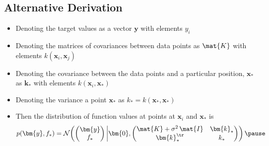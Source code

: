 \begin{slide}
\section[-2]{Alternative Derivation}

\begin{PauseHighLight}
  \begin{itemize}
  \item Denoting the target values as a vector $\bm{y}$ with elements
    $y_i$\pause
  \item Denoting the matrices of covariances between data points as
    $\mat{K}$ with elements $k(\bm{x}_i,\bm{x}_j)$\pause
  \item Denoting the covariance between the data points and a
    particular position, $\bm{x}_*$ as $\bm{k}_*$ with elements
    $k(\bm{x}_i, \bm{x}_*)$\pause
  \item Denoting the variance a point $\bm{x}_*$ as $k_*=k(\bm{x}_*,
    \bm{x}_*)$\pause
  \item Then the distribution of function values at points at $\bm{x}_i$
    and $\bm{x}_*$ is
    \begin{align*}
      p(\bm{y}, f_*) = \mathcal{N}\!\left(
      \begin{pmatrix}
        \bm{y}  \\ f_*
      \end{pmatrix}
      \bigg \vert \bm{0} ,
      \begin{pmatrix}
        \mat{K} + \sigma^2 \, \mat{I} & \bm{k}_* \\
        \bm{k}_*^\tr & k_*
      \end{pmatrix}\right)\pause
    \end{align*}
  \end{itemize}
\end{PauseHighLight}
\end{slide}


